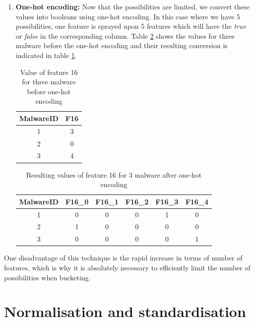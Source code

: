\begin{enumerate}
    \item \textbf{One-hot encoding:} Now that the possibilities are limited, we convert these values into booleans using one-hot encoding. In this case where we have 5 possibilities, one feature is sprayed upon 5 features which will have the \textit{true} or \textit{false} in the corresponding column. Table \ref{tab:a_onehot} shows the values for three malware before the one-hot encoding and their resulting conversion is indicated in table \ref{tab:b_onehot}.
    
    \begin{table}[!h]
        \centering
        \begin{tabular}{|c|c|}
            \hline
             MalwareID &  F16 \\
             \hline
             1 & 3 \\
             \hline
             2 & 0 \\
             \hline
             3 & 4 \\
             \hline
        \end{tabular}
        \caption{Value of feature 16 for three malware before one-hot encoding}
        \label{tab:b_onehot}
    \end{table}
    
    \begin{table}[!h]
        \centering
        \begin{tabular}{|c|c|c|c|c|c|}
            \hline
             MalwareID &  F16\_0 &  F16\_1 & F16\_2 & F16\_3 & F16\_4  \\
             \hline
             1 & 0 & 0 & 0 & 1 & 0 \\
             \hline
             2 & 1 & 0 & 0 & 0 & 0 \\
             \hline
             3 & 0 & 0 & 0 & 0 & 1 \\
             \hline
        \end{tabular}
        \caption{Resulting values of feature 16 for 3 malware after one-hot encoding}
        \label{tab:a_onehot}
    \end{table}
\end{enumerate}

One disadvantage of this technique is the rapid increase in terms of number of features, which is why it is absolutely necessary to efficiently limit the number of possibilities when bucketing.

\section{Normalisation and standardisation}

